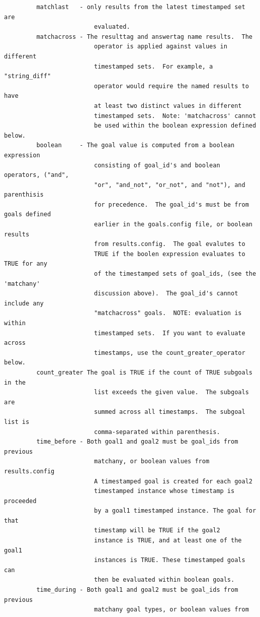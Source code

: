 \documentclass[12pt]{article}
\begin{document}
\begin{verbatim}
         matchlast   - only results from the latest timestamped set are 
                         evaluated.
         matchacross - The resulttag and answertag name results.  The 
                         operator is applied against values in different 
                         timestamped sets.  For example, a "string_diff" 
                         operator would require the named results to have 
                         at least two distinct values in different 
                         timestamped sets.  Note: 'matchacross' cannot 
                         be used within the boolean expression defined below.
         boolean     - The goal value is computed from a boolean expression 
                         consisting of goal_id's and boolean operators, ("and", 
                         "or", "and_not", "or_not", and "not"), and parenthisis 
                         for precedence.  The goal_id's must be from goals defined 
                         earlier in the goals.config file, or boolean results
                         from results.config.  The goal evalutes to 
                         TRUE if the boolen expression evaluates to TRUE for any
                         of the timestamped sets of goal_ids, (see the 'matchany' 
                         discussion above).  The goal_id's cannot include any 
                         "matchacross" goals.  NOTE: evaluation is within 
                         timestamped sets.  If you want to evaluate across 
                         timestamps, use the count_greater_operator below.
         count_greater The goal is TRUE if the count of TRUE subgoals in the 
                         list exceeds the given value.  The subgoals are 
                         summed across all timestamps.  The subgoal list is 
                         comma-separated within parenthesis.
         time_before - Both goal1 and goal2 must be goal_ids from previous 
                         matchany, or boolean values from results.config
                         A timestamped goal is created for each goal2 
                         timestamped instance whose timestamp is proceeded 
                         by a goal1 timestamped instance. The goal for that
                         timestamp will be TRUE if the goal2
                         instance is TRUE, and at least one of the goal1
                         instances is TRUE. These timestamped goals can
                         then be evaluated within boolean goals.
         time_during - Both goal1 and goal2 must be goal_ids from previous 
                         matchany goal types, or boolean values from 

\end{verbatim}
\end{document}
